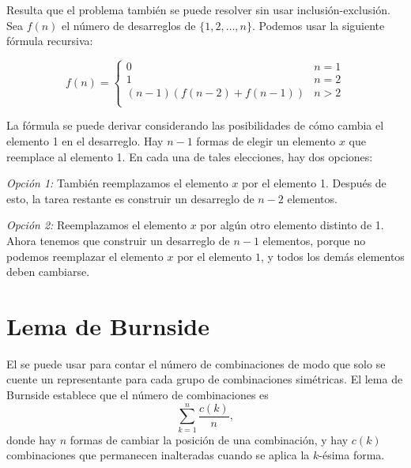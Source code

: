 Resulta que el problema también se puede resolver
sin usar inclusión-exclusión.
Sea $f(n)$ el número de desarreglos
de $\{1,2,\ldots,n\}$. Podemos usar la siguiente
fórmula recursiva:

\begin{equation*}
    f(n) = \begin{cases}
               0               & n = 1\\
               1               & n = 2\\
               (n-1)(f(n-2) + f(n-1)) & n>2 \\
           \end{cases}
\end{equation*}

La fórmula se puede derivar considerando
las posibilidades de cómo cambia el elemento 1
en el desarreglo.
Hay $n-1$ formas de elegir un elemento $x$
que reemplace al elemento 1.
En cada una de tales elecciones, hay dos opciones:

\textit{Opción 1:} También reemplazamos el elemento $x$
por el elemento 1.
Después de esto, la tarea restante es construir
un desarreglo de $n-2$ elementos.

\textit{Opción 2:} Reemplazamos el elemento $x$
por algún otro elemento distinto de 1.
Ahora tenemos que construir un desarreglo
de $n-1$ elementos, porque no podemos reemplazar
el elemento $x$ por el elemento $1$, y todos los demás
elementos deben cambiarse.

\section{Lema de Burnside}


El 
se puede usar para contar
el número de combinaciones de modo que
solo se cuente un representante
para cada grupo de combinaciones simétricas.
El lema de Burnside establece que el número de
combinaciones es
\[\sum_{k=1}^n \frac{c(k)}{n},\]
donde hay $n$ formas de cambiar la
posición de una combinación,
y hay $c(k)$ combinaciones que
permanecen inalteradas cuando se aplica la $k$-ésima forma.

